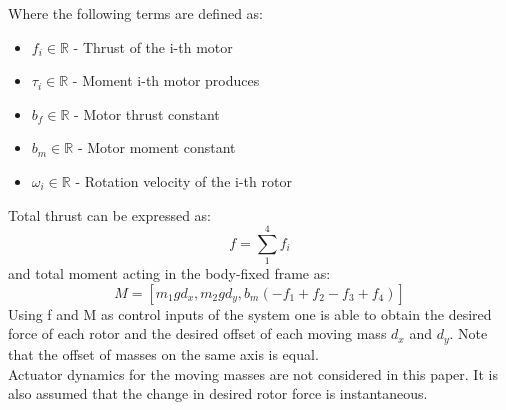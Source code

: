 \noindent Where the following terms are defined as:

\begin{itemize}
	\item $f_i \in \mathbb{R}$ - Thrust of the i-th motor
	
	\item $\tau_i \in \mathbb{R}$ - Moment i-th motor produces
	
	\item $b_f \in \mathbb{R}$ - Motor thrust constant
	
	\item $b_m \in \mathbb{R}$ - Motor moment constant
	
	\item $\omega_i \in \mathbb{R}$ - Rotation velocity of the i-th rotor
\end{itemize}

Total thrust can be expressed as:
\begin{equation}
	f = \sum_{1}^{4}f_i
\end{equation}
and total moment acting in the body-fixed frame as:
\begin{equation}
	M = [m_{1}gd_x ,m_{2}gd_y,b_m(-f_1 + f_2 - f_3 + f_4)]
\end{equation}
Using f and M as control inputs of the system one is able to obtain the desired force of each rotor and the desired offset of each moving mass $d_x$ and $d_y$. Note that the offset of masses on the same axis is equal. \\
Actuator dynamics for the moving masses are not considered in this paper. It is also assumed that the change in desired rotor force is instantaneous. 
